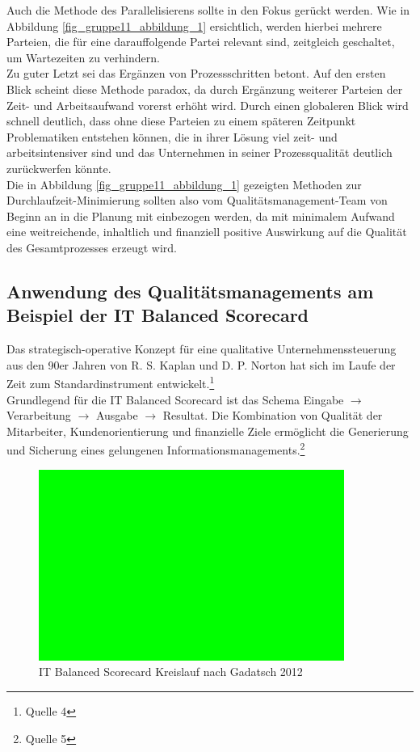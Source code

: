Auch die Methode des Parallelisierens sollte in den Fokus gerückt werden. Wie in Abbildung \ref{fig_gruppe11_abbildung_1} ersichtlich, werden hierbei mehrere Parteien, die für eine darauffolgende Partei relevant sind, zeitgleich geschaltet, um Wartezeiten zu verhindern.\\

Zu guter Letzt sei das Ergänzen von Prozessschritten betont. Auf den ersten Blick scheint diese Methode paradox, da durch Ergänzung weiterer Parteien der Zeit- und Arbeitsaufwand vorerst erhöht wird. Durch einen globaleren Blick wird schnell deutlich, dass ohne diese Parteien zu einem späteren Zeitpunkt Problematiken entstehen können, die in ihrer Lösung viel zeit- und arbeitsintensiver sind und das Unternehmen in seiner Prozessqualität deutlich zurückwerfen könnte.\\

Die in Abbildung \ref{fig_gruppe11_abbildung_1} gezeigten Methoden zur Durchlaufzeit-Minimierung sollten also vom Qualitätsmanagement-Team von Beginn an in die Planung mit einbezogen werden, da mit minimalem Aufwand eine weitreichende, inhaltlich und finanziell positive Auswirkung auf die Qualität des Gesamtprozesses erzeugt wird.

\subsection{Anwendung des Qualitätsmanagements am Beispiel der IT Balanced Scorecard}
Das strategisch-operative Konzept für eine qualitative Unternehmenssteuerung aus den 90er Jahren von R. S. Kaplan und D. P. Norton hat sich im Laufe der Zeit zum Standardinstrument entwickelt.\footnote{Quelle 4}\\

Grundlegend für die IT Balanced Scorecard ist das Schema Eingabe $\to$ Verarbeitung $\to$ Ausgabe $\to$ Resultat. Die Kombination von Qualität der Mitarbeiter, Kundenorientierung und finanzielle Ziele ermöglicht die Generierung und Sicherung eines gelungenen Informationsmanagements.\footnote{Quelle 5}\\

\begin{figure}[h!]
	\centering
	\includegraphics[width=10cm]{kapitel/gruppe1_1/abbildungen/abbildung1}
	\caption{IT Balanced Scorecard Kreislauf nach Gadatsch 2012}
	\label{fig_gruppe11_abbildung_2}
\end{figure}


